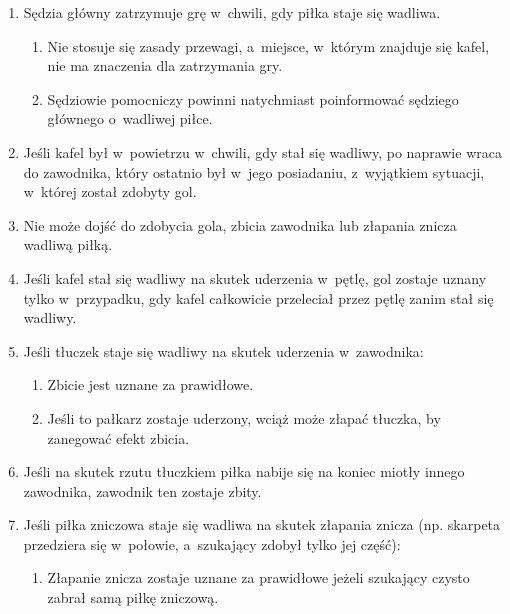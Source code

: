 \documentclass[12pt,a4paper]{article}
\begin{document}
\begin{enumerate}
	\item Sędzia główny zatrzymuje grę w~chwili, gdy piłka staje się wadliwa.

	      \begin{enumerate}
		      \item Nie stosuje się zasady przewagi, a~miejsce, w~którym znajduje się
		            kafel, nie ma znaczenia dla zatrzymania gry.

		      \item Sędziowie pomocniczy powinni natychmiast poinformować sędziego
		            głównego o~wadliwej piłce.
	      \end{enumerate}

	\item Jeśli kafel był w~powietrzu w~chwili, gdy stał się wadliwy, po naprawie wraca do
	      zawodnika, który ostatnio był w~jego posiadaniu, z~wyjątkiem sytuacji, w~której został zdobyty gol.

	\item Nie może dojść do zdobycia gola, zbicia zawodnika lub złapania znicza
	      wadliwą piłką.

	\item Jeśli kafel stał się wadliwy na skutek uderzenia w~pętlę, gol zostaje
	      uznany tylko w~przypadku, gdy kafel całkowicie przeleciał przez pętlę
	      zanim stał się wadliwy.

	\item Jeśli tłuczek staje się wadliwy na skutek uderzenia w~zawodnika:
	      \begin{enumerate}
		      \item Zbicie jest uznane za prawidłowe.

		      \item Jeśli to pałkarz zostaje uderzony, wciąż może złapać tłuczka, by
		            zanegować efekt zbicia.
	      \end{enumerate}

	\item Jeśli na skutek rzutu tłuczkiem piłka nabije się na koniec miotły
	      innego zawodnika, zawodnik ten zostaje zbity.

	\item Jeśli piłka zniczowa staje się wadliwa na skutek złapania znicza (np.
	      skarpeta przedziera się w~połowie, a~szukający zdobył tylko jej część):
	      \begin{enumerate}
		      \item Złapanie znicza zostaje uznane za prawidłowe jeżeli szukający czysto
		            zabrał samą piłkę zniczową.


\end{enumerate}
\end{enumerate}
\end{document}
